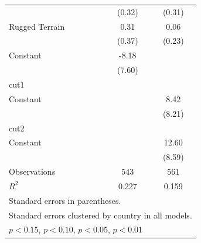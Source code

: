 \documentclass[12pt, letterpaper]{article}
\begin{document}
\begin{table}[htbp]
\begin{small}
\begin{tabular}{l*{2}{c}}
                    &      (0.32)         &      (0.31)         \\
Rugged Terrain      &        0.31         &        0.06         \\
                    &      (0.37)         &      (0.23)         \\
Constant            &       -8.18         &                     \\
                    &      (7.60)         &                     \\
\hline
cut1                &                     &                     \\
Constant            &                     &        8.42         \\
                    &                     &      (8.21)         \\
\hline
cut2                &                     &                     \\
Constant            &                     &       12.60\sym{+}  \\
                    &                     &      (8.59)         \\
\hline
Observations        &         543         &         561         \\
\(R^{2}\)           &            0.227          &         0.159            \\
\hline\hline
\multicolumn{3}{l}{\footnotesize Standard errors in parentheses.}\\
\multicolumn{3}{l}{\footnotesize Standard errors clustered by country in all models.}\\
\multicolumn{3}{l}{\footnotesize \sym{+} \(p<0.15\), \sym{*} \(p<0.10\), \sym{**} \(p<0.05\), \sym{***} \(p<0.01\)}\\
\end{tabular}
\end{small}
\end{table}
\end{document}
